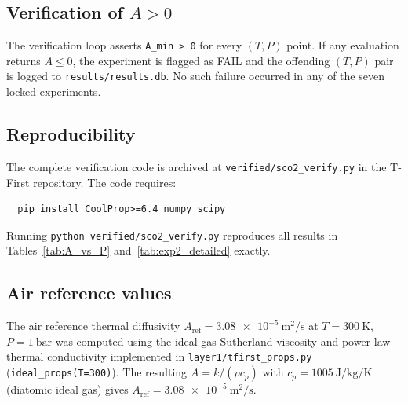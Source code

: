 \documentclass[12pt,a4paper]{article}
\newcommand{\Aref}{A_{\mathrm{ref}}}
\begin{document}
\subsection{Verification of $A > 0$}

The verification loop asserts \texttt{A\_min > 0} for every $(T,P)$ point.
If any evaluation returns $A \leq 0$, the experiment is flagged as FAIL and the
offending $(T,P)$ pair is logged to \texttt{results/results.db}.  No such failure
occurred in any of the seven locked experiments.

\subsection{Reproducibility}

The complete verification code is archived at
\texttt{verified/sco2\_verify.py} in the T-First repository.  The code requires:
\begin{verbatim}
  pip install CoolProp>=6.4 numpy scipy
\end{verbatim}
Running \texttt{python verified/sco2\_verify.py} reproduces all results in
Tables~\ref{tab:A_vs_P} and~\ref{tab:exp2_detailed} exactly.

\subsection{Air reference values}

The air reference thermal diffusivity $\Aref = \SI{3.08e-5}{\metre\squared\per\second}$
at $T = \SI{300}{\kelvin}$, $P = \SI{1}{\bar}$ was computed using the
ideal-gas Sutherland viscosity and power-law thermal conductivity implemented in
\texttt{layer1/tfirst\_props.py} (\texttt{ideal\_props(T=300)}).
The resulting $A = k/(\rho c_p)$ with $c_p = \SI{1005}{\joule\per\kilo\gram\per\kelvin}$
(diatomic ideal gas) gives $\Aref = \SI{3.08e-5}{\metre\squared\per\second}$.



\end{document}
